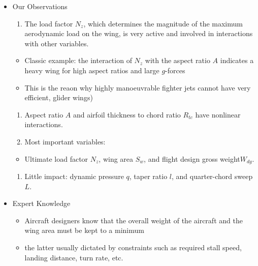 \documentclass[
  letterpaper,
  DIV=11,
  numbers=noendperiod]{scrreprt}
\providecommand{\tightlist}{%
  \setlength{\itemsep}{0pt}\setlength{\parskip}{0pt}}\usepackage{longtable,booktabs,array}
\begin{document}
\begin{itemize}
\tightlist
\item
  Our Observations

  \begin{enumerate}
  \def\labelenumi{\arabic{enumi}.}
  \tightlist
  \item
    The load factor \(N_z\), which determines the magnitude of the
    maximum aerodynamic load on the wing, is very active and involved in
    interactions with other variables.
  \end{enumerate}

  \begin{itemize}
  \tightlist
  \item
    Classic example: the interaction of \(N_z\) with the aspect ratio
    \(A\) indicates a heavy wing for high aspect ratios and large
    \(g\)-forces
  \item
    This is the reaon why highly manoeuvrable fighter jets cannot have
    very efficient, glider wings)
  \end{itemize}

  \begin{enumerate}
  \def\labelenumi{\arabic{enumi}.}
  \setcounter{enumi}{1}
  \tightlist
  \item
    Aspect ratio \(A\) and airfoil thickness to chord ratio \(R_{tc}\)
    have nonlinear interactions.
  \item
    Most important variables:
  \end{enumerate}

  \begin{itemize}
  \tightlist
  \item
    Ultimate load factor \(N_z\), wing area \(S_w\), and flight design
    gross weight\(W_{dg}\).
  \end{itemize}

  \begin{enumerate}
  \def\labelenumi{\arabic{enumi}.}
  \setcounter{enumi}{3}
  \tightlist
  \item
    Little impact: dynamic pressure \(q\), taper ratio \(l\), and
    quarter-chord sweep \(L\).
  \end{enumerate}
\item
  Expert Knowledge

  \begin{itemize}
  \tightlist
  \item
    Aircraft designers know that the overall weight of the aircraft and
    the wing area must be kept to a minimum
  \item
    the latter usually dictated by constraints such as required stall
    speed, landing distance, turn rate, etc.
  \end{itemize}
\end{itemize}
\end{document}
